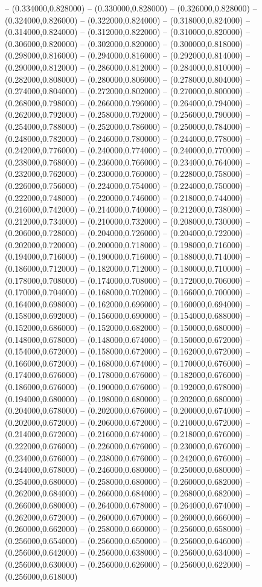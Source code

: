 -- (0.334000,0.828000) -- (0.330000,0.828000) -- (0.326000,0.828000) -- (0.324000,0.826000) -- (0.322000,0.824000) -- (0.318000,0.824000) -- (0.314000,0.824000) -- (0.312000,0.822000) -- (0.310000,0.820000) -- (0.306000,0.820000) -- (0.302000,0.820000) -- (0.300000,0.818000) -- (0.298000,0.816000) -- (0.294000,0.816000) -- (0.292000,0.814000) -- (0.290000,0.812000) -- (0.286000,0.812000) -- (0.284000,0.810000) -- (0.282000,0.808000) -- (0.280000,0.806000) -- (0.278000,0.804000) -- (0.274000,0.804000) -- (0.272000,0.802000) -- (0.270000,0.800000) -- (0.268000,0.798000) -- (0.266000,0.796000) -- (0.264000,0.794000) -- (0.262000,0.792000) -- (0.258000,0.792000) -- (0.256000,0.790000) -- (0.254000,0.788000) -- (0.252000,0.786000) -- (0.250000,0.784000) -- (0.248000,0.782000) -- (0.246000,0.780000) -- (0.244000,0.778000) -- (0.242000,0.776000) -- (0.240000,0.774000) -- (0.240000,0.770000) -- (0.238000,0.768000) -- (0.236000,0.766000) -- (0.234000,0.764000) -- (0.232000,0.762000) -- (0.230000,0.760000) -- (0.228000,0.758000) -- (0.226000,0.756000) -- (0.224000,0.754000) -- (0.224000,0.750000) -- (0.222000,0.748000) -- (0.220000,0.746000) -- (0.218000,0.744000) -- (0.216000,0.742000) -- (0.214000,0.740000) -- (0.212000,0.738000) -- (0.212000,0.734000) -- (0.210000,0.732000) -- (0.208000,0.730000) -- (0.206000,0.728000) -- (0.204000,0.726000) -- (0.204000,0.722000) -- (0.202000,0.720000) -- (0.200000,0.718000) -- (0.198000,0.716000) -- (0.194000,0.716000) -- (0.190000,0.716000) -- (0.188000,0.714000) -- (0.186000,0.712000) -- (0.182000,0.712000) -- (0.180000,0.710000) -- (0.178000,0.708000) -- (0.174000,0.708000) -- (0.172000,0.706000) -- (0.170000,0.704000) -- (0.168000,0.702000) -- (0.166000,0.700000) -- (0.164000,0.698000) -- (0.162000,0.696000) -- (0.160000,0.694000) -- (0.158000,0.692000) -- (0.156000,0.690000) -- (0.154000,0.688000) -- (0.152000,0.686000) -- (0.152000,0.682000) -- (0.150000,0.680000) -- (0.148000,0.678000) -- (0.148000,0.674000) -- (0.150000,0.672000) -- (0.154000,0.672000) -- (0.158000,0.672000) -- (0.162000,0.672000) -- (0.166000,0.672000) -- (0.168000,0.674000) -- (0.170000,0.676000) -- (0.174000,0.676000) -- (0.178000,0.676000) -- (0.182000,0.676000) -- (0.186000,0.676000) -- (0.190000,0.676000) -- (0.192000,0.678000) -- (0.194000,0.680000) -- (0.198000,0.680000) -- (0.202000,0.680000) -- (0.204000,0.678000) -- (0.202000,0.676000) -- (0.200000,0.674000) -- (0.202000,0.672000) -- (0.206000,0.672000) -- (0.210000,0.672000) -- (0.214000,0.672000) -- (0.216000,0.674000) -- (0.218000,0.676000) -- (0.222000,0.676000) -- (0.226000,0.676000) -- (0.230000,0.676000) -- (0.234000,0.676000) -- (0.238000,0.676000) -- (0.242000,0.676000) -- (0.244000,0.678000) -- (0.246000,0.680000) -- (0.250000,0.680000) -- (0.254000,0.680000) -- (0.258000,0.680000) -- (0.260000,0.682000) -- (0.262000,0.684000) -- (0.266000,0.684000) -- (0.268000,0.682000) -- (0.266000,0.680000) -- (0.264000,0.678000) -- (0.264000,0.674000) -- (0.262000,0.672000) -- (0.260000,0.670000) -- (0.260000,0.666000) -- (0.260000,0.662000) -- (0.258000,0.660000) -- (0.256000,0.658000) -- (0.256000,0.654000) -- (0.256000,0.650000) -- (0.256000,0.646000) -- (0.256000,0.642000) -- (0.256000,0.638000) -- (0.256000,0.634000) -- (0.256000,0.630000) -- (0.256000,0.626000) -- (0.256000,0.622000) -- (0.256000,0.618000) 